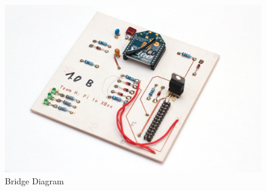 \begin{figure}[H]
\begin{center}
\includegraphics[width=12cm]{images/photos/edited/master1}
\end{center}
\caption{Bridge Diagram}
\label{fig:Bridge Diagram}
\end{figure}
